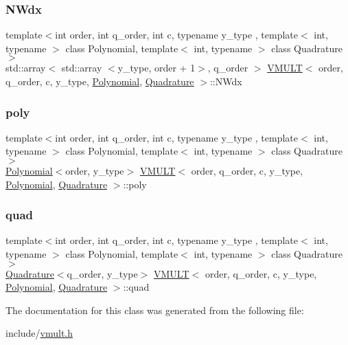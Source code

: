 \mbox{\label{class_v_m_u_l_t_a4fb623e96001cbc01d7289c3465544ec}} 
\subsubsection{\texorpdfstring{N\+Wdx}{NWdx}}
{\footnotesize\ttfamily template$<$int order, int q\+\_\+order, int c, typename y\+\_\+type , template$<$ int, typename $>$ class Polynomial, template$<$ int, typename $>$ class Quadrature$>$ \\
std\+::array$<$ std\+::array $<$y\+\_\+type, order + 1$>$, q\+\_\+order $>$ \hyperlink{class_v_m_u_l_t}{V\+M\+U\+LT}$<$ order, q\+\_\+order, c, y\+\_\+type, \hyperlink{class_polynomial}{Polynomial}, \hyperlink{class_quadrature}{Quadrature} $>$\+::N\+Wdx}

\mbox{\label{class_v_m_u_l_t_ad9e2a7049062262eee02a278aca1da14}} 
\subsubsection{\texorpdfstring{poly}{poly}}
{\footnotesize\ttfamily template$<$int order, int q\+\_\+order, int c, typename y\+\_\+type , template$<$ int, typename $>$ class Polynomial, template$<$ int, typename $>$ class Quadrature$>$ \\
\hyperlink{class_polynomial}{Polynomial}$<$order, y\+\_\+type$>$ \hyperlink{class_v_m_u_l_t}{V\+M\+U\+LT}$<$ order, q\+\_\+order, c, y\+\_\+type, \hyperlink{class_polynomial}{Polynomial}, \hyperlink{class_quadrature}{Quadrature} $>$\+::poly}

\mbox{\label{class_v_m_u_l_t_a4395585e5102243b07c33abc001d1a7a}} 
\subsubsection{\texorpdfstring{quad}{quad}}
{\footnotesize\ttfamily template$<$int order, int q\+\_\+order, int c, typename y\+\_\+type , template$<$ int, typename $>$ class Polynomial, template$<$ int, typename $>$ class Quadrature$>$ \\
\hyperlink{class_quadrature}{Quadrature}$<$q\+\_\+order, y\+\_\+type$>$ \hyperlink{class_v_m_u_l_t}{V\+M\+U\+LT}$<$ order, q\+\_\+order, c, y\+\_\+type, \hyperlink{class_polynomial}{Polynomial}, \hyperlink{class_quadrature}{Quadrature} $>$\+::quad}



The documentation for this class was generated from the following file\+:\begin{DoxyCompactItemize}
\item 
include/\hyperlink{vmult_8h}{vmult.\+h}\end{DoxyCompactItemize}
